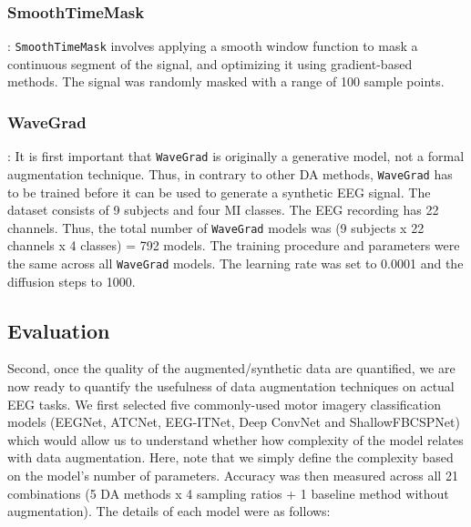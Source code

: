 \documentclass[runningheads]{llncs}
\begin{document}
\subsubsection{SmoothTimeMask}:
\texttt{SmoothTimeMask} involves applying a smooth window function to mask a continuous segment of the signal, and optimizing it using gradient-based methods. The signal was randomly masked with a range of 100 sample points.

\subsubsection{WaveGrad}:
It is first important that \texttt{WaveGrad} is originally a generative model, not a formal augmentation technique.  Thus, in contrary to other DA methods, \texttt{WaveGrad} has to be trained before it can be used to generate a synthetic EEG signal.   The dataset consists of 9 subjects and four MI classes. The EEG recording has 22 channels. Thus, the total number of \texttt{WaveGrad} models was (9 subjects x 22 channels x 4 classes) = 792 models.  The training procedure and parameters were the same across all \texttt{WaveGrad} models. The learning rate was set to 0.0001 and the diffusion steps to 1000.

\subsection{Evaluation}

Second, once the quality of the augmented/synthetic data are quantified, we are now ready to quantify the usefulness of data augmentation techniques on actual EEG tasks.  We first selected five commonly-used motor imagery classification models (EEGNet, ATCNet, EEG-ITNet, Deep ConvNet and ShallowFBCSPNet) which would allow us to understand whether how complexity of the model relates with data augmentation.  Here, note that we simply define the complexity based on the model's number of parameters. Accuracy was then measured across all 21 combinations (5 DA methods x 4 sampling ratios + 1 baseline method without augmentation).  The details of each model were as follows:
\end{document}

